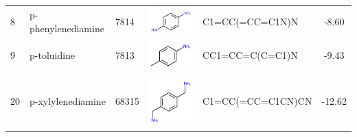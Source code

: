 \documentclass[aps,pre,twocolumn,nofootinbib,superscriptaddress,10pt, final,tightenlines]{revtex4-1}
\begin{document}
\begin{table}
\begin{tabular}{lllp{2cm}>{\ttfamily}lS[table-format=-1.2, table-figures-uncertainty=1]}
8   & p-phenylenediamine       & 7814      & \parbox[c]{1em}{\includegraphics[scale=0.2]{figures/7814.pdf}}  & C1=CC(=CC=C1N)N                      & -8.60                                             \\
9   & p-toluidine              & 7813      & \parbox[c]{1em}{\includegraphics[scale=0.2]{figures/7813.pdf}}  & CC1=CC=C(C=C1)N                      & -9.43                                             \\
20  & p-xylylenediamine        & 68315     & \parbox[c]{1em}{\includegraphics[scale=0.2]{figures/68315.pdf}} & C1=CC(=CC=C1CN)CN                    & -12.62                                            \\

\end{tabular}
\end{table}
\end{document}
